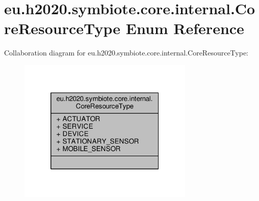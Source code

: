\hypertarget{enumeu_1_1h2020_1_1symbiote_1_1core_1_1internal_1_1CoreResourceType}{}\section{eu.\+h2020.\+symbiote.\+core.\+internal.\+Core\+Resource\+Type Enum Reference}
\label{enumeu_1_1h2020_1_1symbiote_1_1core_1_1internal_1_1CoreResourceType}


Collaboration diagram for eu.\+h2020.\+symbiote.\+core.\+internal.\+Core\+Resource\+Type\+:\nopagebreak
\begin{figure}[H]
\begin{center}
\leavevmode
\includegraphics[width=236pt]{enumeu_1_1h2020_1_1symbiote_1_1core_1_1internal_1_1CoreResourceType__coll__graph}
\end{center}
\end{figure}
